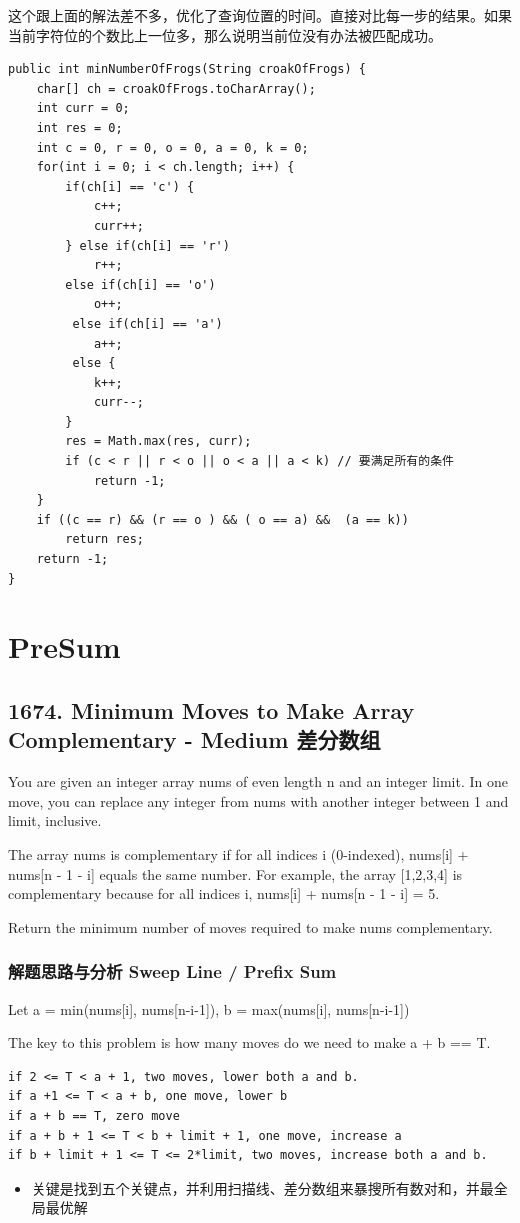 \documentclass[9pt, b5paaper]{book}
\begin{document}
这个跟上面的解法差不多，优化了查询位置的时间。直接对比每一步的结果。如果当前字符位的个数比上一位多，那么说明当前位没有办法被匹配成功。

\begin{verbatim}
public int minNumberOfFrogs(String croakOfFrogs) {
    char[] ch = croakOfFrogs.toCharArray();
    int curr = 0;
    int res = 0;
    int c = 0, r = 0, o = 0, a = 0, k = 0;
    for(int i = 0; i < ch.length; i++) {
        if(ch[i] == 'c') {
            c++;
            curr++;
        } else if(ch[i] == 'r') 
            r++;
        else if(ch[i] == 'o') 
            o++;
         else if(ch[i] == 'a') 
            a++;
         else {
            k++; 
            curr--;
        }
        res = Math.max(res, curr);
        if (c < r || r < o || o < a || a < k) // 要满足所有的条件
            return -1;
    }
    if ((c == r) && (r == o ) && ( o == a) &&  (a == k)) 
        return res;
    return -1;
}
\end{verbatim}


\chapter{PreSum}
\label{sec-9}
\section{1674. Minimum Moves to Make Array Complementary - Medium 差分数组}
\label{sec-9-1}
You are given an integer array nums of even length n and an integer limit. In one move, you can replace any integer from nums with another integer between 1 and limit, inclusive.

The array nums is complementary if for all indices i (0-indexed), nums[i] + nums[n - 1 - i] equals the same number. For example, the array [1,2,3,4] is complementary because for all indices i, nums[i] + nums[n - 1 - i] = 5.

Return the minimum number of moves required to make nums complementary.
\subsection{解题思路与分析 Sweep Line / Prefix Sum}
\label{sec-9-1-1}
Let a = min(nums[i], nums[n-i-1]), b = max(nums[i], nums[n-i-1])

The key to this problem is how many moves do we need to make a + b == T.
\begin{verbatim}
if 2 <= T < a + 1, two moves, lower both a and b.
if a +1 <= T < a + b, one move, lower b
if a + b == T, zero move
if a + b + 1 <= T < b + limit + 1, one move, increase a
if b + limit + 1 <= T <= 2*limit, two moves, increase both a and b.
\end{verbatim}
\begin{itemize}
\item 关键是找到五个关键点，并利用扫描线、差分数组来暴搜所有数对和，并最全局最优解
\end{itemize}
\end{document}
